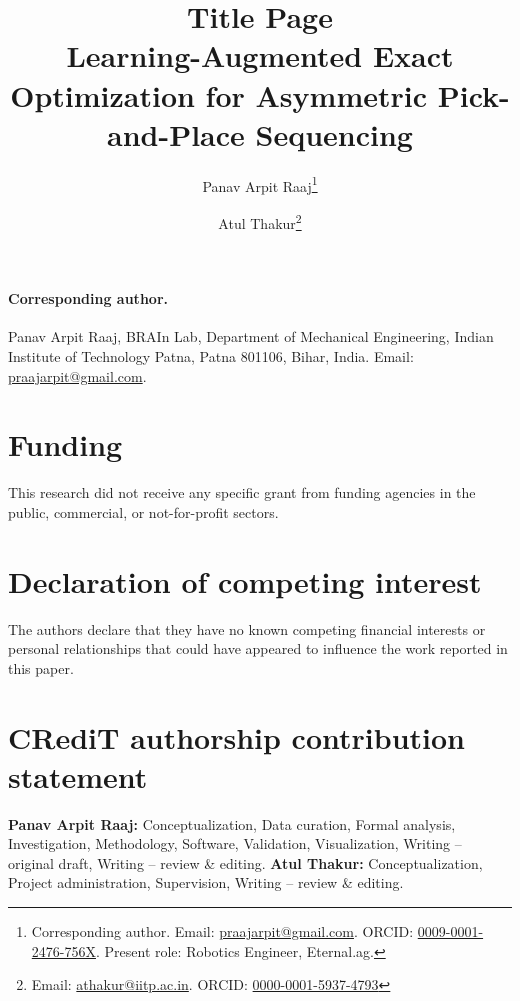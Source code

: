 \documentclass[12pt]{article}
\title{\textbf{Title Page}\\[0.5em]
Learning-Augmented Exact Optimization for Asymmetric Pick-and-Place Sequencing}
\date{}
\author[1]{Panav Arpit Raaj\thanks{Corresponding author. Email: \href{mailto:praajarpit@gmail.com}{praajarpit@gmail.com}. ORCID: \href{https://orcid.org/0009-0001-2476-756X}{0009-0001-2476-756X}. Present role: Robotics Engineer, Eternal.ag.}}
\author[1]{Atul Thakur\thanks{Email: \href{mailto:athakur@iitp.ac.in}{athakur@iitp.ac.in}. ORCID: \href{https://orcid.org/0000-0001-5937-4793}{0000-0001-5937-4793}}}
\affil[1]{BRAIn Lab, Department of Mechanical Engineering, Indian Institute of Technology Patna, Patna 801106, Bihar, India}
\begin{document}
\maketitle

\paragraph{Corresponding author.}
Panav Arpit Raaj, BRAIn Lab, Department of Mechanical Engineering, Indian Institute of Technology Patna, Patna 801106, Bihar, India. Email: \href{mailto:praajarpit@gmail.com}{praajarpit@gmail.com}.

\section*{Funding}
This research did not receive any specific grant from funding agencies in the public, commercial, or not-for-profit sectors.

\section*{Declaration of competing interest}
The authors declare that they have no known competing financial interests or personal relationships that could have appeared to influence the work reported in this paper.

\section*{CRediT authorship contribution statement}
\textbf{Panav Arpit Raaj:} Conceptualization, Data curation, Formal analysis, Investigation, Methodology, Software, Validation, Visualization, Writing -- original draft, Writing -- review \& editing.
\textbf{Atul Thakur:} Conceptualization, Project administration, Supervision, Writing -- review \& editing.
\end{document}
